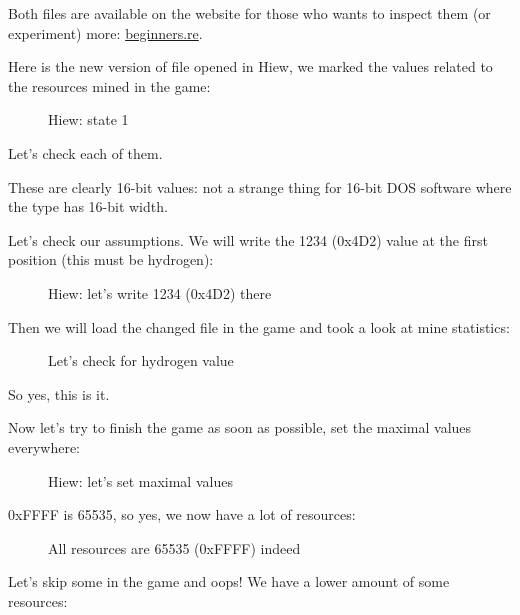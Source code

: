 Both files are available on the website for those who wants to inspect them (or experiment) more: 
\href{http://beginners.re/examples/millenium_DOS_game/}{beginners.re}.

\clearpage
Here is the new version of file opened in Hiew, we marked the values related to the resources mined in the game: 

\begin{figure}[H]
\centering
{}
\caption{Hiew: state 1}
\label{fig:mill_hiew3}
\end{figure}

Let's check each of them.

These are clearly 16-bit values: not a strange thing for 16-bit DOS software where the \Tint type has 16-bit width.

\clearpage
Let's check our assumptions.
We will write the 1234 (0x4D2) value at the first position (this must be hydrogen):

\begin{figure}[H]
\centering
{}
\caption{Hiew: let's write 1234 (0x4D2) there}
\label{fig:mill_hiew4}
\end{figure}

Then we will load the changed file in the game and took a look at mine statistics:

\begin{figure}[H]
\centering
{}
\caption{Let's check for hydrogen value}
\label{fig:mill_5}
\end{figure}

So yes, this is it.

\clearpage
Now let's try to 
finish the game as soon as possible, set the maximal values everywhere:

\begin{figure}[H]
\centering
{}
\caption{Hiew: let's set maximal values}
\label{fig:mill_hiew7}
\end{figure}

0xFFFF is 65535, so yes, we now have a 
lot of resources:

\begin{figure}[H]
\centering
{}
\caption{All resources are 65535 (0xFFFF) indeed}
\label{fig:mill_6}
\end{figure}

\clearpage
Let's skip some  in the game and oops! 
We have a lower amount of some resources:


